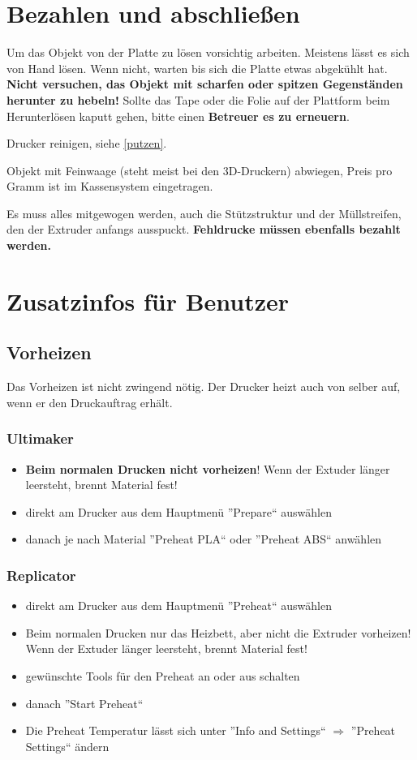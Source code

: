 \documentclass{\basedir/fablab-document}
\begin{document}
\section{Bezahlen und abschließen}

Um das Objekt von der Platte zu lösen vorsichtig arbeiten. Meistens lässt es sich von Hand lösen. Wenn nicht,
warten bis sich die Platte etwas abgekühlt hat. \textbf{Nicht versuchen, das Objekt mit scharfen oder spitzen Gegenständen herunter zu hebeln!}
Sollte das Tape oder die Folie auf der Plattform beim Herunterlösen kaputt gehen, bitte einen \textbf{Betreuer es zu erneuern}.

Drucker reinigen, siehe \ref{putzen}.

Objekt mit Feinwaage (steht meist bei den 3D-Druckern) abwiegen, Preis pro Gramm ist im Kassensystem eingetragen. 

Es muss alles mitgewogen werden, auch die Stützstruktur und der Müllstreifen, den der Extruder anfangs ausspuckt. \textbf{Fehldrucke müssen ebenfalls bezahlt werden.}
\section{Zusatzinfos für Benutzer}
\subsection{Vorheizen} \label{vorheizen}
Das Vorheizen ist nicht zwingend nötig. Der Drucker heizt auch von selber auf, wenn er den Druckauftrag erhält.

\subsubsection{Ultimaker}
\begin{itemize}
	\item \textbf{Beim normalen Drucken nicht vorheizen}! Wenn der Extuder länger leersteht, brennt Material fest!
	\item direkt am Drucker aus dem Hauptmenü ''Prepare`` auswählen
	\item danach je nach Material ''Preheat PLA`` oder ''Preheat ABS`` anwählen
\end{itemize}

\subsubsection{Replicator}
\begin{itemize}
 \item direkt am Drucker aus dem Hauptmenü ''Preheat`` auswählen
 \item Beim normalen Drucken nur das Heizbett, aber nicht die Extruder vorheizen! Wenn der Extuder länger leersteht, brennt Material fest!
 \item gewünschte Tools für den Preheat an oder aus schalten
 \item danach ''Start Preheat``
 \item Die Preheat Temperatur lässt sich unter ''Info and Settings`` $\Rightarrow$ ''Preheat Settings`` ändern
\end{itemize}
\end{document}
